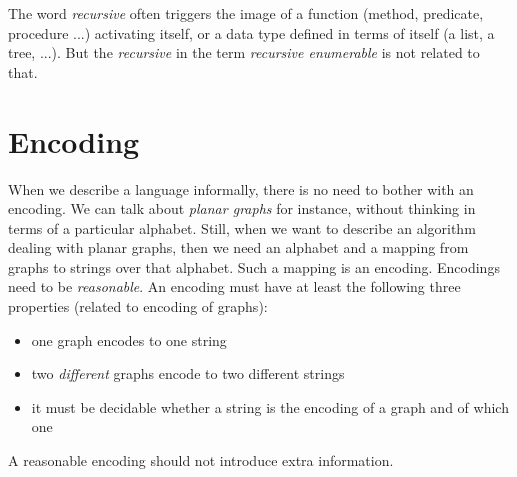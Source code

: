 The word {\em recursive} often triggers the image of a function
(method, predicate, procedure ...) activating itself, or a data type
defined in terms of itself (a list, a tree, ...). But the {\em
  recursive} in the term {\em recursive enumerable} is not related to
that.



\section{Encoding}

When we describe a language informally, there is no need to bother
with an encoding. We can talk about {\em planar graphs} for instance,
without thinking in terms of a particular alphabet. Still, when we
want to describe an algorithm dealing with planar graphs, then we need
an alphabet and a mapping from graphs to strings over that alphabet.
Such a mapping is an encoding. Encodings need to be {\em
  reasonable}. An encoding must have at least the following three
properties (related to encoding of graphs):
\begin{itemize}
\item one graph encodes to one string
\item two {\em different} graphs encode to two different strings
\item it must be decidable whether a string is the encoding of a graph
  and of which one
\end{itemize}
A reasonable encoding should not introduce extra information.

